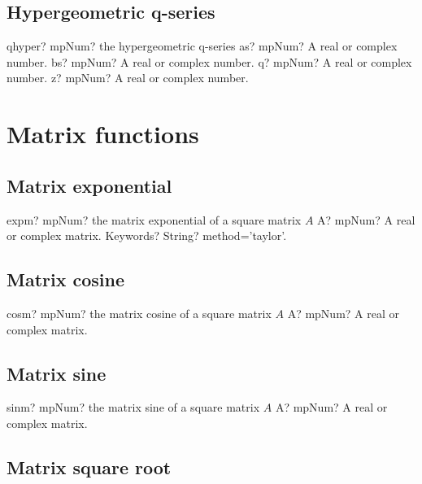 \documentclass[12pt,a4paper,openany]{book}
\begin{document}
\section{Hypergeometric q-series}

\begin{mpFunctionsExtract}
\mpFunctionFour
{qhyper? mpNum? the hypergeometric q-series}
{as? mpNum? A real or complex number.}
{bs? mpNum? A real or complex number.}
{q? mpNum? A real or complex number.}
{z? mpNum? A real or complex number.}
\end{mpFunctionsExtract}

\chapter{Matrix functions}

\section{Matrix exponential}

\begin{mpFunctionsExtract}
\mpFunctionTwo
{expm? mpNum? the matrix exponential of a square matrix $A$}
{A? mpNum? A real or complex matrix.}
{Keywords? String? method='taylor'.}
\end{mpFunctionsExtract}

\section{Matrix cosine}

\begin{mpFunctionsExtract}
\mpFunctionOne
{cosm? mpNum? the matrix cosine of a square matrix $A$}
{A? mpNum? A real or complex matrix.}
\end{mpFunctionsExtract}

\section{Matrix sine}

\begin{mpFunctionsExtract}
\mpFunctionOne
{sinm? mpNum? the matrix sine of a square matrix $A$}
{A? mpNum? A real or complex matrix.}
\end{mpFunctionsExtract}

\section{Matrix square root}
\end{document}
